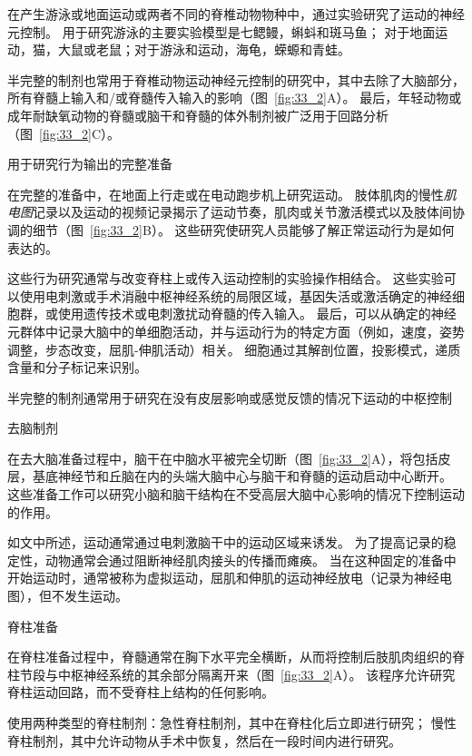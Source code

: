 \begin{proposition}[用于研究运动神经元控制的制剂] \label{box:33_1}
	
	\quad \quad 在产生游泳或地面运动或两者不同的脊椎动物物种中，通过实验研究了运动的神经元控制。
	用于研究游泳的主要实验模型是七鳃鳗，蝌蚪和斑马鱼；
	对于地面运动，猫，大鼠或老鼠；对于游泳和运动，海龟，蝾螈和青蛙。
	
	\quad \quad 半完整的制剂也常用于脊椎动物运动神经元控制的研究中，其中去除了大脑部分，所有脊髓上输入和/或脊髓传入输入的影响（图~\ref{fig:33_2}A）。
	最后，年轻动物或成年耐缺氧动物的脊髓或脑干和脊髓的体外制剂被广泛用于回路分析（图~\ref{fig:33_2}C）。
	
	\quad \quad 用于研究行为输出的完整准备
	
	\quad \quad 在完整的准备中，在地面上行走或在电动跑步机上研究运动。
	肢体肌肉的慢性\textit{肌电图}记录以及运动的视频记录揭示了运动节奏，肌肉或关节激活模式以及肢体间协调的细节（图~\ref{fig:33_2}B）。
	这些研究使研究人员能够了解正常运动行为是如何表达的。
	
	\quad \quad 这些行为研究通常与改变脊柱上或传入运动控制的实验操作相结合。
	这些实验可以使用电刺激或手术消融中枢神经系统的局限区域，基因失活或激活确定的神经细胞群，或使用遗传技术或电刺激扰动脊髓的传入输入。
	最后，可以从确定的神经元群体中记录大脑中的单细胞活动，并与运动行为的特定方面（例如，速度，姿势调整，步态改变，屈肌-伸肌活动）相关。
	细胞通过其解剖位置，投影模式，递质含量和分子标记来识别。
	
	\quad \quad 半完整的制剂通常用于研究在没有皮层影响或感觉反馈的情况下运动的中枢控制
	
	\quad \quad 去脑制剂
	
	\quad \quad 在去大脑准备过程中，脑干在中脑水平被完全切断（图~\ref{fig:33_2}A），将包括皮层，基底神经节和丘脑在内的头端大脑中心与脑干和脊髓的运动启动中心断开。
	这些准备工作可以研究小脑和脑干结构在不受高层大脑中心影响的情况下控制运动的作用。
	
	\quad \quad 如文中所述，运动通常通过电刺激脑干中的运动区域来诱发。
	为了提高记录的稳定性，动物通常会通过阻断神经肌肉接头的传播而瘫痪。
	当在这种固定的准备中开始运动时，通常被称为虚拟运动，屈肌和伸肌的运动神经放电（记录为神经电图），但不发生运动。
	
	\quad \quad 脊柱准备
	
	\quad \quad 在脊柱准备过程中，脊髓通常在胸下水平完全横断，从而将控制后肢肌肉组织的脊柱节段与中枢神经系统的其余部分隔离开来（图~\ref{fig:33_2}A）。
	该程序允许研究脊柱运动回路，而不受脊柱上结构的任何影响。
	
	\quad \quad 使用两种类型的脊柱制剂：急性脊柱制剂，其中在脊柱化后立即进行研究；
	慢性脊柱制剂，其中允许动物从手术中恢复，然后在一段时间内进行研究。
	

\end{proposition}
